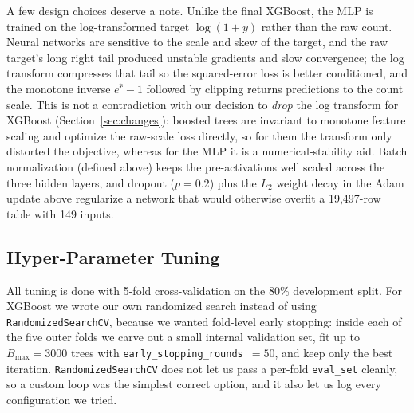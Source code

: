 \documentclass[journal]{IEEEtran}
\begin{document}
A few design choices deserve a note. Unlike the final XGBoost, the MLP is
trained on the log-transformed target $\log(1+y)$ rather than the raw count.
Neural networks are sensitive to the scale and skew of the target, and the raw
target's long right tail produced unstable gradients and slow convergence; the
log transform compresses that tail so the squared-error loss is better
conditioned, and the monotone inverse $e^{\hat r}-1$ followed by clipping returns
predictions to the count scale. This is not a contradiction with our decision to
\emph{drop} the log transform for XGBoost (Section~\ref{sec:changes}): boosted
trees are invariant to monotone feature scaling and optimize the raw-scale loss
directly, so for them the transform only distorted the objective, whereas for the
MLP it is a numerical-stability aid. Batch normalization
(defined above) keeps the pre-activations well scaled across the three hidden
layers, and dropout ($p=0.2$) plus the $L_2$ weight decay in the Adam update
above regularize a network that would otherwise overfit a 19{,}497-row table with 149
inputs.

\subsection{Hyper-Parameter Tuning}
\label{sec:tuning}
All tuning is done with 5-fold cross-validation on the 80\% development split.
For XGBoost we wrote our own randomized search instead of using
\texttt{RandomizedSearchCV}, because we wanted fold-level early stopping: inside
each of the five outer folds we carve out a small internal validation set, fit
up to $B_{\max}=3000$ trees with \texttt{early\_stopping\_rounds}~$=50$, and keep
only the best iteration. \texttt{RandomizedSearchCV} does not let us pass a
per-fold \texttt{eval\_set} cleanly, so a custom loop was the simplest correct
option, and it also let us log every configuration we tried.
\end{document}

